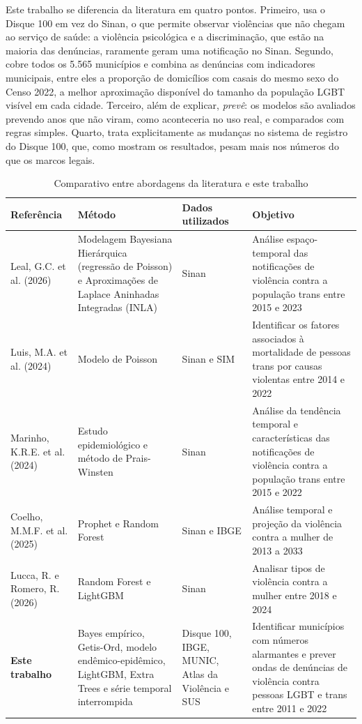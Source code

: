 \documentclass[12pt]{article}
\begin{document}
Este trabalho se diferencia da literatura em quatro pontos. Primeiro, usa o Disque 100 em vez do Sinan, o que permite observar violências que não chegam ao serviço de saúde: a violência psicológica e a discriminação, que estão na maioria das denúncias, raramente geram uma notificação no Sinan. Segundo, cobre todos os 5.565 municípios e combina as denúncias com indicadores municipais, entre eles a proporção de domicílios com casais do mesmo sexo do Censo 2022, a melhor aproximação disponível do tamanho da população LGBT visível em cada cidade. Terceiro, além de explicar, \textit{prevê}: os modelos são avaliados prevendo anos que não viram, como aconteceria no uso real, e comparados com regras simples. Quarto, trata explicitamente as mudanças no sistema de registro do Disque 100, que, como mostram os resultados, pesam mais nos números do que os marcos legais.

\begin{table}[H]
\centering
\caption{Comparativo entre abordagens da literatura e este trabalho}
{\renewcommand{\arraystretch}{1.2}

\begin{tabular}{>{\raggedright\arraybackslash}p{3.2cm} >{\raggedright\arraybackslash}p{3.2cm} >{\raggedright\arraybackslash}p{3.2cm} >{\raggedright\arraybackslash}p{3.2cm}}
\hline
\textbf{Referência} & \textbf{Método} & \textbf{Dados utilizados} & \textbf{Objetivo}\\
\hline
Leal, G.C. et al. (2026) & Modelagem Bayesiana Hierárquica (regressão de Poisson) e Aproximações de Laplace Aninhadas Integradas (INLA) & Sinan & Análise espaço-temporal das notificações de violência contra a população trans entre 2015 e 2023
\\
Luis, M.A. et al. (2024) & Modelo de Poisson & Sinan e SIM & Identificar os fatores associados à mortalidade de pessoas trans por causas violentas entre 2014 e 2022
\\
Marinho, K.R.E. et al. (2024) & Estudo epidemiológico e método de Prais-Winsten & Sinan & Análise da tendência temporal e características das notificações de violência contra a população trans entre 2015 e 2022
\\
Coelho, M.M.F. et al. (2025) & Prophet e Random Forest & Sinan e IBGE & Análise temporal e projeção da violência contra a mulher de 2013 a 2033
\\
Lucca, R. e Romero, R. (2026) & Random Forest e LightGBM & Sinan & Analisar tipos de violência contra a mulher entre 2018 e 2024
\\
\hline
\textbf{Este trabalho} & Bayes empírico, Getis-Ord, modelo endêmico-epidêmico, LightGBM, Extra Trees e série temporal interrompida & Disque 100, IBGE, MUNIC, Atlas da Violência e SUS & Identificar municípios com números alarmantes e prever ondas de denúncias de violência contra pessoas LGBT e trans entre 2011 e 2022
\\
\hline
\end{tabular}
}
\label{tab:referencia}
\end{table}
\end{document}
